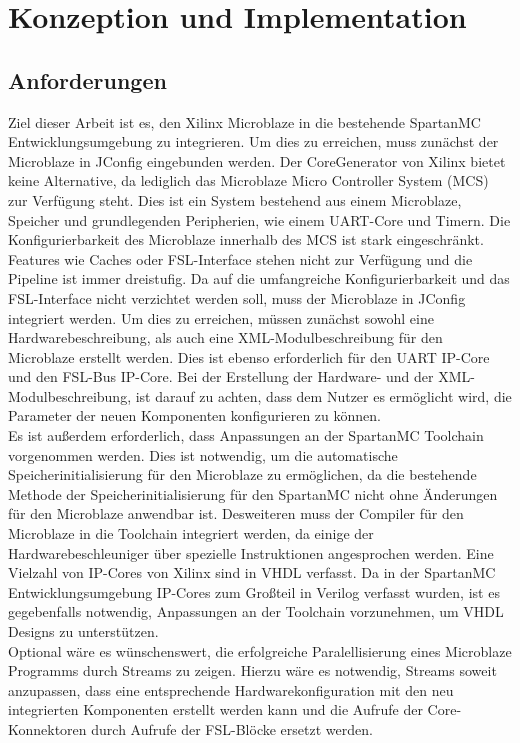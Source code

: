 \chapter{Konzeption und Implementation}
\section{Anforderungen}
Ziel dieser Arbeit ist es, den Xilinx Microblaze in die bestehende SpartanMC Entwicklungsumgebung zu integrieren. Um dies zu erreichen, muss zunächst der Microblaze in JConfig eingebunden werden. Der CoreGenerator von Xilinx bietet keine Alternative, da lediglich das Microblaze Micro Controller System (MCS) \cite{MCS} zur Verfügung steht. Dies ist ein System bestehend aus einem Microblaze, Speicher und grundlegenden Peripherien, wie einem UART-Core und Timern. Die Konfigurierbarkeit des Microblaze innerhalb des MCS ist stark eingeschränkt. Features wie Caches oder FSL-Interface stehen nicht zur Verfügung und die Pipeline ist immer dreistufig. Da auf die umfangreiche Konfigurierbarkeit und das FSL-Interface nicht verzichtet werden soll, muss der Microblaze in JConfig integriert werden. Um dies zu erreichen, müssen zunächst sowohl eine Hardwarebeschreibung, als auch eine XML-Modulbeschreibung für den Microblaze erstellt werden. Dies ist ebenso erforderlich für den UART IP-Core und den FSL-Bus IP-Core. Bei der Erstellung der Hardware- und der XML-Modulbeschreibung, ist darauf zu achten, dass dem Nutzer es ermöglicht wird, die Parameter der neuen Komponenten konfigurieren zu können.\\
Es ist außerdem erforderlich, dass Anpassungen an der SpartanMC Toolchain vorgenommen werden. Dies ist notwendig, um die automatische Speicherinitialisierung für den Microblaze zu ermöglichen, da die bestehende Methode der Speicherinitialisierung für den SpartanMC nicht ohne Änderungen für den Microblaze anwendbar ist. Desweiteren muss der Compiler für den Microblaze in die Toolchain integriert werden, da einige der Hardwarebeschleuniger über spezielle Instruktionen angesprochen werden. Eine Vielzahl von IP-Cores von Xilinx sind in VHDL verfasst. Da in der SpartanMC Entwicklungsumgebung IP-Cores zum Großteil in Verilog verfasst wurden, ist es gegebenfalls notwendig, Anpassungen an der Toolchain vorzunehmen, um VHDL Designs zu unterstützen.\\
Optional wäre es wünschenswert, die erfolgreiche Paralellisierung eines Microblaze Programms durch \textmu\/Streams zu zeigen. Hierzu wäre es notwendig, 
\textmu\/Streams soweit anzupassen, dass eine entsprechende Hardwarekonfiguration mit den neu integrierten Komponenten erstellt werden kann und
die Aufrufe der Core-Konnektoren durch Aufrufe der FSL-Blöcke ersetzt werden.
